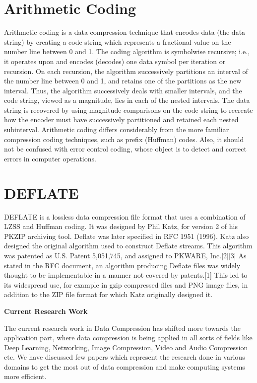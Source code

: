 \documentclass{article}
\begin{document}
\section{Arithmetic Coding}

Arithmetic coding is a data compression technique that encodes data (the data string) by creating a code string which represents a fractional value on the number line between 0 and 1. The coding algorithm is symbolwise recursive; i.e., it operates upon and encodes (decodes) one data symbol per iteration or recursion. On each recursion, the algorithm successively partitions an interval of the number line between 0 and 1, and retains one of the partitions as the new interval. Thus, the algorithm successively deals with smaller intervals, and the code string, viewed as a magnitude, lies in each of the nested intervals. The data string is recovered by using magnitude comparisons on the code string to recreate how the encoder must have successively partitioned and retained each nested subinterval. Arithmetic coding differs considerably from the more familiar compression coding techniques, such as prefix (Huffman) codes. Also, it should not be confused with error control coding, whose object is to detect and correct errors in computer operations.

\section{DEFLATE}

DEFLATE is a lossless data compression file format that uses a combination of LZSS and Huffman coding. It was designed by Phil Katz, for version 2 of his PKZIP archiving tool. Deflate was later specified in RFC 1951 (1996). Katz also designed the original algorithm used to construct Deflate streams. This algorithm was patented as U.S. Patent 5,051,745, and assigned to PKWARE, Inc.[2][3] As stated in the RFC document, an algorithm producing Deflate files was widely thought to be implementable in a manner not covered by patents.[1] This led to its widespread use, for example in gzip compressed files and PNG image files, in addition to the ZIP file format for which Katz originally designed it.

\vspace{0.3in}

\textbf{\Large{Current Research Work}}

The current research work in Data Compression has shifted more towards the application part, where data compression is being applied in all sorts of fields like Deep Learning, Networking, Image Compression, Video and Audio Compression etc. We have discussed few papers which represent the research done in various domains to get the most out of data compression and make computing systems more efficient.
\end{document}
